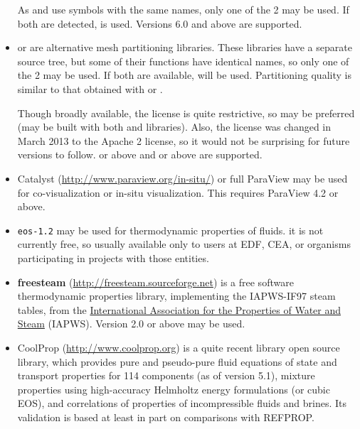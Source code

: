 \documentclass[a4paper,10pt,twoside]{csshortdoc}
\begin{document}
\begin{itemize}
      As \scotch and \ptscotch use symbols with the same names, only
      one of the 2 may be used. If both are detected, \ptscotch is used.
      Versions 6.0 and above are supported.

\item \metis or \parmetis are alternative mesh partitioning libraries.
      These libraries have a separate source tree, but some of their
      functions have identical names, so only one of the 2 may be used.
      If both are available, \parmetis will be used. Partitioning
      quality is similar to that obtained with \scotch or
      \ptscotch.

      Though broadly available, the \parmetis license is quite restrictive,
      so \ptscotch may be preferred (\CS may be built with both
      \metis and \scotch libraries). Also, the \metis license was changed
      in March 2013 to the Apache 2 license, so it would not be surprising
      for future \parmetis versions to follow.  or above and
       or above are supported.

\item Catalyst (\url{http://www.paraview.org/in-situ/}) or full ParaView
      may be used for co-visualization or in-situ visualization.
      This requires ParaView 4.2 or above.

\item \texttt{eos-1.2} may be used for thermodynamic properties of fluids.
      it is not currently free, so usually available only to users at EDF,
      CEA, or organisms participating in projects with those entities.

\item \textbf{freesteam} (\url{http://freesteam.sourceforge.net}) is a
      free software thermodynamic properties library, implementing the
      IAPWS-IF97 steam tables, from the \href{http://www.iapws.org}{International
      Association for the Properties of Water and Steam} (IAPWS).
      Version 2.0 or above may be used.

\item CoolProp (\url{http://www.coolprop.org}) is a quite recent library
      open source library, which provides pure and pseudo-pure fluid
      equations of state and transport properties for 114 components
      (as of version 5.1), mixture properties using high-accuracy Helmholtz
      energy formulations (or cubic EOS), and correlations of properties
      of incompressible fluids and brines. Its validation is based at least
      in part on comparisons with REFPROP.


\end{itemize}
\end{document}

